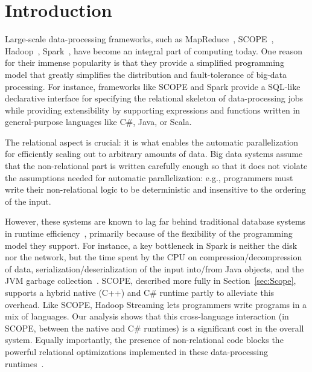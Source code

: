 \section{Introduction}
Large-scale data-processing frameworks, such as MapReduce~\cite{MapReduce}, SCOPE~\cite{SCOPE}, Hadoop~\cite{Hadoop}, Spark~\cite{Spark}, have become an integral part of computing today. One reason for their immense popularity is that they provide a simplified programming model that greatly simplifies the distribution and fault-tolerance of big-data processing. For instance, frameworks like SCOPE and Spark provide a SQL-like declarative interface for specifying the relational skeleton of data-processing jobs while providing extensibility by supporting expressions and functions written in general-purpose languages like C\#, Java, or Scala. 

The relational aspect is crucial: it is what enables the automatic parallelization for efficiently scaling out to arbitrary amounts of data.
Big data systems assume that the non-relational part is written carefully enough so that it does not violate the assumptions needed for automatic parallelization: e.g., programmers must write their non-relational logic to be deterministic and insensitive to the ordering of the input.

However, these systems are known to lag far behind traditional database systems in runtime efficiency~\cite{Jahani:2011,Pavlo:2009}, primarily because of the flexibility of the programming model they support. For instance,  a key bottleneck in Spark is neither the disk nor the network, but the time spent by the CPU on compression/decompression of data, serialization/deserialization of the input into/from Java objects, and the JVM garbage collection~\cite{ousterhout-nsdi15}. SCOPE,  described more fully in Section~\ref{sec:Scope}, supports a hybrid native (C++) and C\# runtime partly to alleviate this overhead.
Like SCOPE, Hadoop Streaming lets programmers write programs in a mix of languages\cite{hadoop_stream}. 
Our analysis shows that this cross-language interaction (in SCOPE, between the native and C\# runtimes) is a significant cost in the overall system.  
Equally importantly, the presence of non-relational code blocks the powerful relational optimizations implemented in these data-processing runtimes~\cite{non-relational-opt-papers}. 


